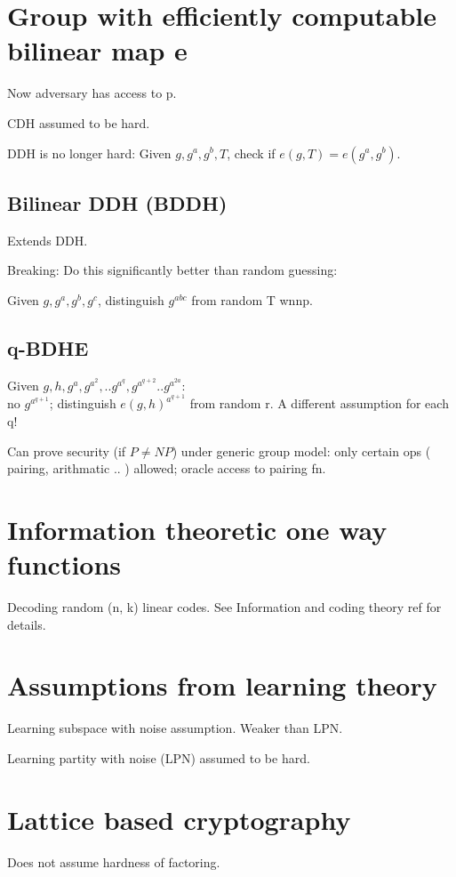 \documentclass[oneside, article]{memoir}
\begin{document}
\section{Group with efficiently computable bilinear map e}
Now adversary has access to p.

CDH assumed to be hard.

DDH is no longer hard: Given $g, g^{a}, g^{b}, T$, check if $e(g, T) = e(g^{a}, g^{b})$.

\subsection{Bilinear DDH (BDDH)}
Extends DDH.

Breaking: Do this significantly better than random guessing:

Given $g, g^{a}, g^{b}, g^{c}$, distinguish $g^{abc}$ from random T wnnp.

\subsection{q-BDHE}
Given $g, h, g^{a}, g^{a^{2}}, .. g^{a^{q}}, g^{a^{q+2}} .. g^{a^{2a}}$:\\
 no $g^{a^{q+1}}$; distinguish $e(g,h)^{a^{q+1}}$ from random r. A different assumption for each q!

Can prove security (if $P\neq NP$) under generic group model: only certain ops ( pairing, arithmatic .. ) allowed; oracle access to pairing fn.

\section{Information theoretic one way functions}
Decoding random (n, k) linear codes. See Information and coding theory ref for details.

\section{Assumptions from learning theory}
Learning subspace with noise assumption. Weaker than LPN.

Learning partity with noise (LPN) assumed to be hard.

\section{Lattice based cryptography}
Does not assume hardness of factoring.

\tbc
\end{document}
